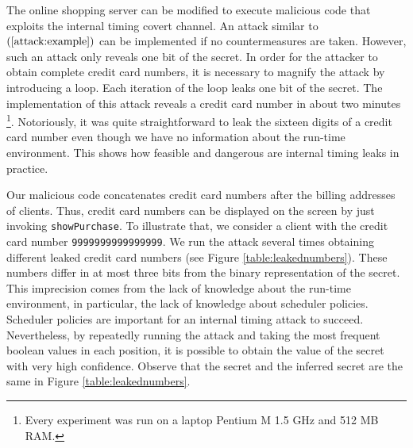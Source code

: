 \documentclass[times, 10pt,twocolumn]{article}
\begin{document}

The online shopping server can be modified to 
execute malicious code that exploits the internal timing covert
channel. An attack similar to $(\ref{attack:example})$
can be implemented if no countermeasures are taken. 
However, such an attack only reveals one bit of the secret. 
In order for the attacker to obtain complete  
credit card numbers, it is necessary to magnify the attack by introducing a
loop. Each iteration of the loop leaks one bit of the secret. 
The implementation of this attack reveals a credit 
card number in about two minutes 
\footnote{Every experiment was run on a laptop Pentium M 1.5 GHz and 512 MB
  RAM.}. Notoriously, it was quite straightforward to 
leak the sixteen digits of a credit card number even though 
we have no information about the run-time environment.
This shows how feasible   
and dangerous are internal timing leaks in practice.

Our malicious code concatenates credit card 
numbers after the billing addresses of clients. 
Thus, credit card numbers can be displayed on the screen by just
invoking \texttt{showPurchase}. To illustrate that, we consider
a client with the credit card number \texttt{9999999999999999}.
We run the  
attack several times obtaining different leaked credit card numbers
(see Figure \ref{table:leakednumbers}). These numbers 
differ in at most three bits from the binary representation of
the secret. This imprecision  comes from the lack of 
knowledge about the run-time environment, in particular, the lack of
knowledge about scheduler policies. Scheduler policies 
are important for an internal timing attack to succeed. 
Nevertheless, by repeatedly running the
attack and taking the most frequent boolean values in each
position, it is possible to obtain the value of the secret with very
high confidence. Observe that the secret and the inferred secret are the same 
in Figure \ref{table:leakednumbers}.

\end{document}
